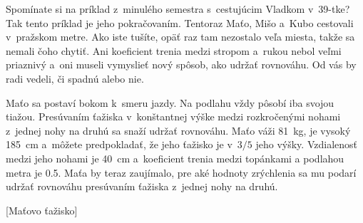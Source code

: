 Spomínate si na príklad z~minulého semestra s~cestujúcim Vladkom v~39-tke? Tak tento príklad je jeho pokračovaním.
Tentoraz Maťo, Mišo a~Kubo cestovali v~pražskom metre. Ako iste tušíte, opäť raz tam nezostalo veľa miesta, takže sa nemali čoho chytiť.
Ani koeficient trenia medzi stropom a~rukou nebol veľmi priaznivý a~oni museli vymyslieť nový spôsob, ako udržať rovnováhu.
Od vás by radi vedeli, či spadnú alebo nie.

Maťo sa postaví bokom k~smeru jazdy. Na podlahu vždy pôsobí iba svojou tiažou.
Presúvaním ťažiska v~konštantnej výške medzi rozkročenými nohami z~jednej nohy na druhú sa snaží udržať rovnováhu.
Maťo váži \SI{81}{\kilo\gram}, je vysoký \SI{185}{\centi\metre} a~môžete predpokladať, že jeho ťažisko je v~$3/5$ jeho výšky.
Vzdialenosť medzi jeho nohami je \SI{40}{\centi\metre} a~koeficient trenia medzi topánkami a podlahou metra je \num{0.5}.
Maťa by teraz zaujímalo, pre aké hodnoty zrýchlenia sa mu podarí udržať rovnováhu presúvaním ťažiska z~jednej nohy na druhú.

[Maťovo ťažisko]
